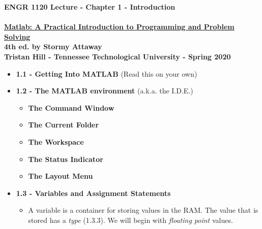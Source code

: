 \documentclass[11pt]{article}
\newcommand{\NUM}{1 }
\begin{document}
\textbf{ \LARGE ENGR 1120 Lecture -  Chapter \NUM - Introduction} \\\\
\textbf{ \hspace*{5mm}\underline{Matlab: A Practical Introduction to Programming and Problem Solving}\vspace{1mm}\\ 
                \hspace*{5mm}4th ed. by Stormy Attaway }\vspace{2mm}\\
\textbf{ \hspace*{5mm}Tristan Hill - Tennessee Technological University - Spring 2020 } \vspace{3mm}\\


\begin{itemize}


	\item \textbf{ \LARGE 1.1 -  Getting Into MATLAB } (Read this on your own)
	\item \textbf{ \LARGE 1.2 -  The MATLAB environment  } (a.k.a. the I.D.E.)
	
		
		\begin{itemize}
			\item \textbf{\Large The Command Window} \vspace{100mm}
			\item \textbf{\Large The Current Folder} \vspace{100mm}
			\item \textbf{\Large The Workspace} \vspace{100mm}		
			\item \textbf{\Large The Status Indicator} \vspace{50mm}
			\item \textbf{\Large The Layout Menu} \vspace{50mm}		
		\end{itemize}






	\newpage
	\item \textbf{ \LARGE 1.3 - Variables and Assignment Statements} \\
		\begin{itemize}
			\item \Large{A variable is a container for storing values in the RAM. The value that is stored has a {\it type} (1.3.3). We will begin with {\it floating point} values.} \vspace{50mm}
			

\end{itemize}
\end{itemize}
\end{document}

